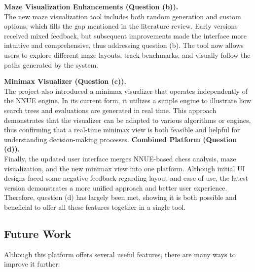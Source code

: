 \documentclass[12pt,a4paper]{article}
\begin{document}
\vspace{0.5em}
\noindent
\textbf{Maze Visualization Enhancements (Question (b)).} \\
The new maze visualization tool includes both random generation and custom
options, which fills the gap mentioned in the literature review. Early versions
received mixed feedback, but subsequent improvements made the interface more
intuitive and comprehensive, thus addressing question (b). The tool now allows
users to explore different maze layouts, track benchmarks, and visually follow the
paths generated by the system.

\vspace{0.5em}
\noindent
\textbf{Minimax Visualizer (Question (c)).} \\
The project also introduced a minimax visualizer that operates independently of
the NNUE engine. In its current form, it utilizes a simple engine to illustrate
how search trees and evaluations are generated in real time. This approach
demonstrates that the visualizer can be adapted to various algorithms or engines,
thus confirming that a real-time minimax view is both feasible and helpful for
understanding decision-making processes.
\vspace{0.5em}
\noindent
\textbf{Combined Platform (Question (d)).} \\
Finally, the updated user interface merges NNUE-based chess analysis, maze
visualization, and the new minimax view into one platform. Although initial UI
designs faced some negative feedback regarding layout and ease of use, the
latest version demonstrates a more unified approach and better user experience.
Therefore, question (d) has largely been met, showing it is both possible and
beneficial to offer all these features together in a single tool.
\subsection{Future Work}

Although this platform offers several useful features, there are many ways to
improve it further:
\end{document}
